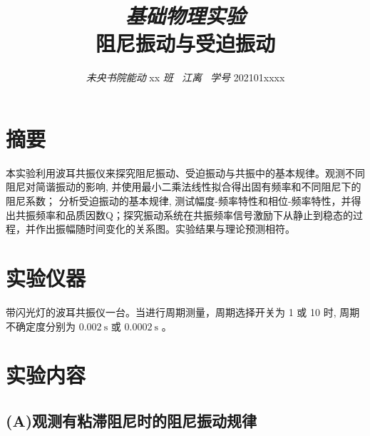 \documentclass[11pt,a4paper,UTF8]{ctexart}
\title{\textit{\large 基础物理实验}\\[2mm]
		\textbf{\LARGE 阻尼振动与受迫振动}}
\author{\textit{未央书院能动} xx \textit{班 \ 江离 \ 学号} 202101xxxx}
\date{}
\begin{document}
\tableofcontents
\maketitle

\section{摘要}

本实验利用波耳共振仪来探究阻尼振动、受迫振动与共振中的基本规律。观测不同阻尼对简谐振动的影响, 并使用最小二乘法线性拟合得出固有频率和不同阻尼下的阻尼系数；
分析受迫振动的基本规律, 测试幅度-频率特性和相位-频率特性，并得出共振频率和品质因数Q；探究振动系统在共振频率信号激励下从静止到稳态的过程，并作出振幅随时间变化的关系图。实验结果与理论预测相符。

\section{实验仪器}

带闪光灯的波耳共振仪一台。当进行周期测量，周期选择开关为 1 或 10 时, 周期不确定度分别为 $0.002 \mathrm{~s}$ 或 $0.0002 \mathrm{~s}$ 。

\section{实验内容}

\subsection{(A)观测有粘滞阻尼时的阻尼振动规律}
\end{document}

